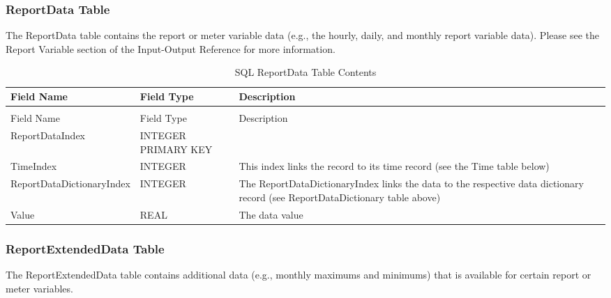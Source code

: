 \subsubsection{ReportData Table}

The ReportData table contains the report or meter variable data (e.g., the hourly, daily, and monthly report variable data). Please see the Report Variable section of the Input-Output Reference for more information.

\begin{longtable}[c]{p{1.5in}p{1.5in}p{3.0in}}
\caption{SQL ReportData Table Contents \label{table:table-8.-sql-reportdata-table-contents}} \tabularnewline
\toprule 
Field Name & Field Type & Description \tabularnewline
\midrule
\endfirsthead

\caption[]{SQL ReportData Table Contents} \tabularnewline
\toprule 
Field Name & Field Type & Description \tabularnewline
\midrule
\endhead

ReportDataIndex & INTEGER PRIMARY KEY &  \tabularnewline
TimeIndex & INTEGER & This index links the record to its time record (see the Time table below) \tabularnewline
ReportDataDictionaryIndex & INTEGER & The ReportDataDictionaryIndex links the data to the respective data dictionary record (see ReportDataDictionary table above) \tabularnewline
Value & REAL & The data value \tabularnewline
\bottomrule
\end{longtable}

\subsubsection{ReportExtendedData Table}

The ReportExtendedData table contains additional data (e.g., monthly maximums and minimums) that is available for certain report or meter variables.

